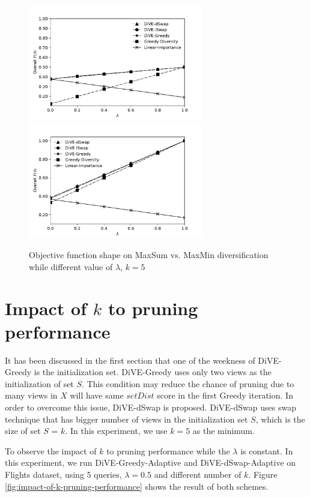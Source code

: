 \documentclass{article}
\begin{document}
\begin{figure}
	\begin{center}
		\includegraphics[width=3.0in]{figures/1_tradeoff_June_objf_disease_maxSUM}
		\includegraphics[width=3.0in]{figures/1_tradeoff_June_objf_disease_MaxMIN}
		\caption{Objective function shape on MaxSum vs. MaxMin diversification while different value of $\lambda$, $k = 5$}
		\label{fig:Objective-function-maxsum-maxmin}
	\end{center}
\end{figure}




\section{Impact of $ k $ to pruning performance}

It has been discussed in the first section that one of the weekness of DiVE-Greedy is the initialization set. DiVE-Greedy uses only two views as the initialization of set $S$. This condition may reduce the chance of pruning due to many views in $X$ will have same $setDist$ score in the first Greedy iteration. In order to overcome this issue, DiVE-dSwap is proposed. DiVE-dSwap uses swap technique that has bigger number of views in the initialization set $S$, which is the size of set $S$ = $k$. In this experiment, we use $k = 5$ as the minimum.  

To observe the impact of $k$ to pruning performance while the $\lambda$ is constant. In this experiment, we run DiVE-Greedy-Adaptive and DiVE-dSwap-Adaptive on Flights dataset, using 5 queries, $\lambda = 0.5$ and different number of $k$. Figure \ref{fig:impact-of-k-pruning-performance} shows the result of both schemes.
\end{document}

